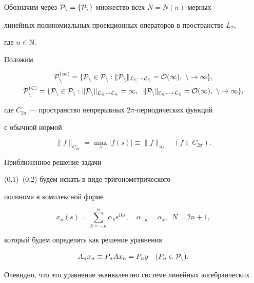 Обозначим через $\cal P_n=\{ P_n\}$ множество всех $N=N(n)$-мерных


линейных полиномиальных проекционных операторов в пространстве $L_2$,


где $n\in \Bbb N$.


Положим


\begin{gather*}


\rukopis{P}_n^{(1)}=\{ P_n\in \rukopis{P}_n : \|P_n\|_{L_2\rightarrow L_2}


=O(1),\ n\rightarrow \infty\}, \\


%


\rukopis{P}_n^{(2)}=\{ P_n\in \rukopis{P}_n : \|P_n\|_{L_2\rightarrow L_2}


=\infty,\ \; \|P_n\|_{C_{2\pi}\rightarrow L_2} =O(1),


\ n\rightarrow\infty \},


\end{gather*}


где $C_{2\pi}$ --- пространство непрерывных $2\pi$-периодических функций


с обычной нормой


$$


\|f\|_{C_{2\pi}}=\max_s |f(s)|\equiv \|f\|_{\infty }\quad (f\in C_{2\pi}).


$$





Приближенное решение задачи


(0.1)--(0.2) будем искать в виде тригонометрического


полинома в комплексной форме


\begin{equation}


x_n(s)=\sum_{k=-n}^n\alpha_k e^{iks},\quad \alpha_{-k}=


\overline{\alpha_k},\ \; N=2n+1,


\end{equation}


который будем определять как решение уравнения


\begin{equation}


A_nx_n\equiv P_nAx_n=P_ny\quad (P_n\in \rukopis{P}_n).


\end{equation}


Очевидно, что это уравнение эквивалентно системе линейных алгебраических


